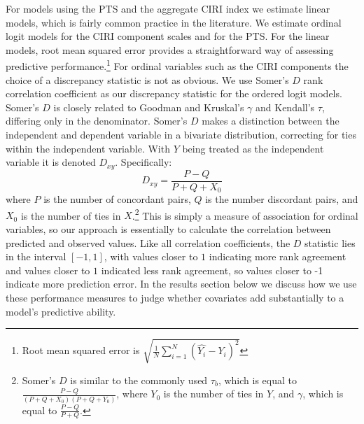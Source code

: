 \documentclass[12pt]{article}
\begin{document}
For models using the PTS and the aggregate CIRI index we estimate linear models, which is fairly common practice in the literature. We estimate ordinal logit models for the CIRI component scales and for the PTS. For the linear models, root mean squared error provides a straightforward way of assessing predictive performance.\footnote{Root mean squared error is $\displaystyle \sqrt{\frac{1}{N} \sum\limits_{i=1}^N (\hat{Y_{i}} - Y_{i})^2} $} For ordinal variables such as the CIRI components the choice of a discrepancy statistic is not as obvious. We use Somer's $D$ rank correlation coefficient  \citep{Somers1962} as our discrepancy statistic for the ordered logit models.
Somer's $D$ is closely related to Goodman and Kruskal's $\gamma$ and Kendall's $\tau$, differing only in the denominator. Somer's $D$ makes a distinction between the independent and dependent variable in a bivariate distribution, correcting for ties within the independent variable. With $Y$ being treated as the independent variable it is denoted $D_{xy}$. 
Specifically:
$$D_{xy} = \frac{P - Q}{P + Q + X_0}$$
\noindent where $P$ is the number of concordant pairs, $Q$ is the number discordant pairs, and $X_0$ is the number of ties in $X$.\footnote{Somer's $D$ is similar to the commonly used $\tau_b$, which is equal to $\frac{P - Q}{(P+Q+X_0)(P+Q+Y_0)}$, where $Y_0$ is the number of ties in $Y$, and $\gamma$, which is equal to $\frac{P - Q}{P + Q}$.} This is simply a measure of association for ordinal variables, so our approach is essentially to calculate the correlation between predicted and observed values. Like all correlation coefficients, the $D$ statistic lies in the interval $[-1, 1]$, with values closer to $1$ indicating more rank agreement and values closer to $1$ indicated less rank agreement, so values closer to -1 indicate more prediction error. In the results section below we discuss how we use these performance measures to judge whether covariates add substantially to a model's predictive ability. 
\end{document}
